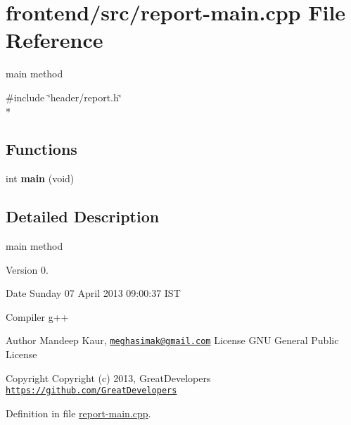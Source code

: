 \hypertarget{report-main_8cpp}{\section{frontend/src/report-\/main.cpp File Reference}
\label{report-main_8cpp}
}


main method  


{\ttfamily \#include \char`\"{}header/report.\-h\char`\"{}}\\*
\subsection*{Functions}
\begin{DoxyCompactItemize}
\item 
\hypertarget{report-main_8cpp_a840291bc02cba5474a4cb46a9b9566fe}{int {\bfseries main} (void)}\label{report-main_8cpp_a840291bc02cba5474a4cb46a9b9566fe}

\end{DoxyCompactItemize}


\subsection{Detailed Description}
main method \begin{DoxyVersion}{Version}
0. 
\end{DoxyVersion}
\begin{DoxyDate}{Date}
Sunday 07 April 2013 09\-:00\-:37 I\-S\-T\par
Compiler g++
\end{DoxyDate}
\begin{DoxyAuthor}{Author}
Mandeep Kaur, \href{mailto:meghasimak@gmail.com}{\tt meghasimak@gmail.\-com} License G\-N\-U General Public License 
\end{DoxyAuthor}
\begin{DoxyCopyright}{Copyright}
Copyright (c) 2013, Great\-Developers \href{https://github.com/GreatDevelopers}{\tt https\-://github.\-com/\-Great\-Developers} 
\end{DoxyCopyright}


Definition in file \hyperlink{report-main_8cpp_source}{report-\/main.\-cpp}.


